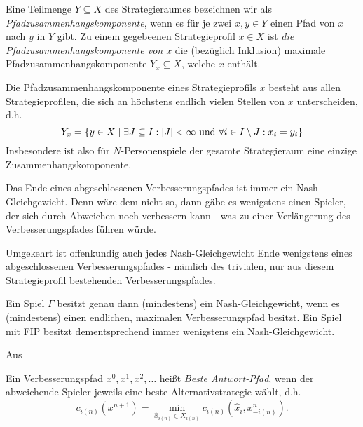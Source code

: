 \begin{defn}
	Eine Teilmenge $Y \subseteq X$ des Strategieraumes bezeichnen wir als \emph{Pfadzusammenhangskomponente}, wenn es für je zwei $x, y \in Y$ einen Pfad von $x$ nach $y$ in $Y$ gibt. Zu einem gegebeenen Strategieprofil $x \in X$ ist \emph{die Pfadzusammenhangskomponente von $x$} die (bezüglich Inklusion) maximale Pfadzusammenhangskomponente $Y_x \subseteq X$, welche $x$ enthält.
\end{defn}

\begin{beob}
	Die Pfadzusammenhangskomponente eines Strategieprofils $x$ besteht aus allen Strategieprofilen, die sich an höchstens endlich vielen Stellen von $x$ unterscheiden, d.h.
		\[Y_x = \left\{y \in X \mid \exists J \subseteq I: \left|J\right| < \infty \text{ und } \forall i \in I\setminus J: x_i = y_i \right\} \]
	Insbesondere ist also für $N$-Personenspiele der gesamte Strategieraum eine einzige Zusammenhangskomponente.
\end{beob}

\begin{beob}\label{beob:VerbPfadeundNGe}
	Das Ende eines abgeschlossenen Verbesserungspfades ist immer ein Nash-Gleichgewicht. Denn wäre dem nicht so, dann gäbe es wenigstens einen Spieler, der sich durch Abweichen noch verbessern kann - was zu einer Verlängerung des Verbesserungspfades führen würde. 
		
	Umgekehrt ist offenkundig auch jedes Nash-Gleichgewicht Ende wenigstens eines abgeschlossenen Verbesserungspfades - nämlich des trivialen, nur aus diesem Strategieprofil bestehenden Verbesserungspfades.
\end{beob}

\begin{kor}\label{kor:ExVerbPfadExNG}
	Ein Spiel $\Gamma$ besitzt genau dann (mindestens) ein Nash-Gleichgewicht, wenn es (mindestens) einen endlichen, maximalen Verbesserungspfad besitzt. Ein Spiel mit FIP besitzt dementsprechend immer wenigstens ein Nash-Gleichgewicht.
\end{kor}

Aus \cite{BestRespPot}

\begin{defn}
	Ein Verbesserungspfad $x^0, x^1, x^2, \dots$ heißt \emph{Beste Antwort-Pfad}, wenn der abweichende Spieler jeweils eine beste Alternativstrategie wählt, d.h. 
		\[c_{i(n)}(x^{n+1}) = \min_{\hat{x}_{i(n)} \in X_{i(n)}} c_{i(n)}(\hat{x}_i,x^n_{-i(n)}).\]
\end{defn}


